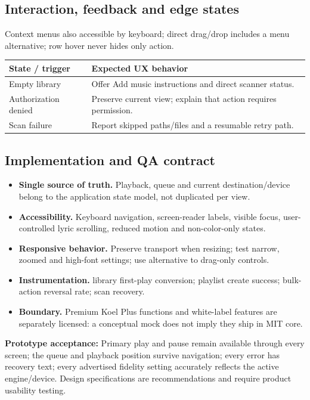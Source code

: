 \documentclass[10pt,a4paper,oneside]{report}
\begin{document}
\subsection*{Interaction, feedback and edge states}
Context menus also accessible by keyboard; direct drag/drop includes a menu alternative; row hover never hides only action.\par
\begin{tabularx}{\linewidth}{@{}p{39mm}X@{}}\toprule State / trigger & Expected UX behavior\\\midrule
Empty library & Offer Add music instructions and direct scanner status.\\
Authorization denied & Preserve current view; explain that action requires permission.\\
Scan failure & Report skipped paths/files and a resumable retry path.\\
\bottomrule\end{tabularx}
\subsection*{Implementation and QA contract}
\begin{itemize}[leftmargin=*,itemsep=2pt,topsep=2pt]
\item \textbf{Single source of truth.} Playback, queue and current destination/device belong to the application state model, not duplicated per view.
\item \textbf{Accessibility.} Keyboard navigation, screen-reader labels, visible focus, user-controlled lyric scrolling, reduced motion and non-color-only states.
\item \textbf{Responsive behavior.} Preserve transport when resizing; test narrow, zoomed and high-font settings; use alternative to drag-only controls.
\item \textbf{Instrumentation.} library first-play conversion; playlist create success; bulk-action reversal rate; scan recovery.
\item \textbf{Boundary.} Premium Koel Plus functions and white-label features are separately licensed: a conceptual mock does not imply they ship in MIT core.
\end{itemize}
\vspace{2mm}\begin{evidencebox}\small\textbf{Prototype acceptance:} Primary play and pause remain available through every screen; the queue and playback position survive navigation; every error has recovery text; every advertised fidelity setting accurately reflects the active engine/device. Design specifications are recommendations and require product usability testing.\end{evidencebox}
\clearpage
\end{document}
